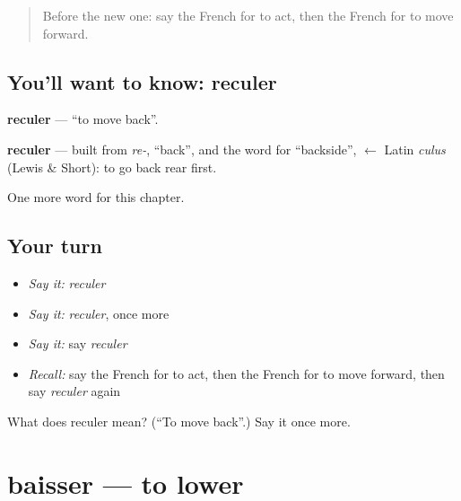 \label{lesson:FR-C152-reculer}



\begin{quote}
Before the new one: say the French for to act, then the French for to move forward.
\end{quote}

\subsection*{You'll want to know: reculer}
\textbf{reculer} — \textquotedblleft{}to move back\textquotedblright{}.

\begin{cousinweb}
\textbf{reculer} — built from \emph{re-}, \textquotedblleft{}back\textquotedblright{}, and the word for \textquotedblleft{}backside\textquotedblright{}, $\leftarrow$ Latin \emph{culus} (Lewis \& Short): to go back rear first.
\end{cousinweb}

\begin{grammarlens}[title={What you've built}]
One more word for this chapter.
\end{grammarlens}

\subsection*{Your turn}
\begin{itemize}
\raggedright
  \item \emph{Say it:} \emph{reculer}
  \item \emph{Say it:} \emph{reculer}, once more
  \item \emph{Say it:} say \emph{reculer}
  \item \emph{Recall:} say the French for to act, then the French for to move forward, then say \emph{reculer} again
\end{itemize}

\begin{tcolorbox}[breakable,colback=teal!4,colframe=teal!35!black,title={Before you move on}]
What does reculer mean? (\textquotedblleft{}To move back\textquotedblright{}.) Say it once more.
\end{tcolorbox}
\section[baisser]{baisser — to lower}

\label{lesson:FR-C152-baisser}



